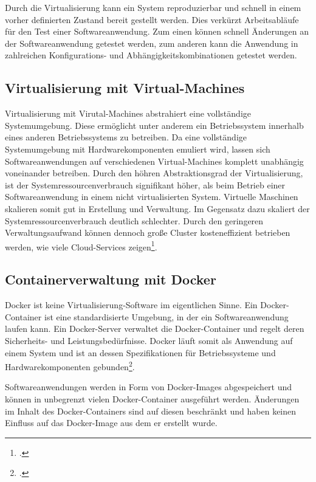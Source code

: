 Durch die Virtualisierung kann ein System reproduzierbar und schnell in einem vorher definierten Zustand bereit gestellt werden. Dies verkürzt Arbeitsabläufe für den Test einer Softwareanwendung. Zum einen können schnell Änderungen an der Softwareanwendung getestet werden, zum anderen kann die Anwendung in zahlreichen Konfigurations- und Abhängigkeitskombinationen getestet werden.

\subsection{Virtualisierung mit Virtual-Machines}

Virtualisierung mit Virutal-Machines abstrahiert eine vollständige Systemumgebung. Diese ermöglicht unter anderem ein Betriebssystem innerhalb eines anderen Betriebssystems zu betreiben. Da eine vollständige Systemumgebung mit Hardwarekomponenten emuliert wird, lassen sich Softwareanwendungen auf verschiedenen Virtual-Machines komplett unabhängig voneinander betreiben.
Durch den höhren Abstraktionsgrad der Virtualisierung, ist der Systemressourcenverbrauch signifikant höher, als beim Betrieb einer Softwareanwendung in einem nicht virtualisierten System. Virtuelle Maschinen skalieren somit gut in Erstellung und Verwaltung. Im Gegensatz dazu skaliert der Systemressourcenverbrauch deutlich schlechter. Durch den geringeren Verwaltungsaufwand können dennoch große Cluster kosteneffizient betrieben werden, wie viele Cloud-Services zeigen\footcite[vgl.][]{a-cloud-guru-cost}.

\subsection{Containerverwaltung mit Docker}

Docker ist keine Virtualisierung-Software im eigentlichen Sinne. Ein Docker-Container ist eine standardisierte Umgebung, in der ein Softwareanwendung laufen kann. Ein Docker-Server verwaltet die Docker-Container und regelt deren Sicherheits- und Leistungsbedürfnisse. Docker läuft somit als Anwendung auf einem System und ist an dessen Spezifikationen für Betriebssysteme und Hardwarekomponenten gebunden\footcite[vgl.][Kap. Why are containers important]{learn-docker}.

Softwareanwendungen werden in Form von Docker-Images abgespeichert und können in unbegrenzt vielen Docker-Container ausgeführt werden. Änderungen im Inhalt des Docker-Containers sind auf diesen beschränkt und haben keinen Einfluss auf das Docker-Image aus dem er erstellt wurde.

